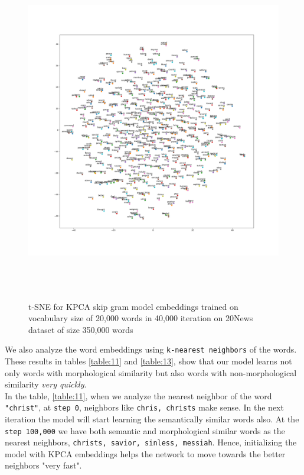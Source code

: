  \begin{figure}
  	\centering
  	\includegraphics[width=18cm,height=15cm,keepaspectratio]{files/M128smallnews/M128smallnews.png}
  	\caption{t-SNE for KPCA skip gram model embeddings trained on vocabulary size of 20,000 words in 40,000 iteration on 20News dataset of size 350,000 words }
  	\label{fig:t1sne}
  \end{figure}
We also analyze the word embeddings using \texttt{k-nearest neighbors} of the words. These results in tables \ref{table:11} and \ref{table:13}, show that our model learns not only words with morphological similarity but also words with non-morphological similarity \textit{very quickly}.\\
In the table, \ref{table:11}, when we analyze the nearest neighbor of the word \texttt{"christ"}, at \texttt{step 0}, neighbors like \texttt{chris, christs} make sense. In the next iteration the model will start learning the semantically similar words also. At the \texttt{step 100,000} we have both semantic and morphological similar words as the nearest neighbors, \texttt{christs, savior, sinless, messiah}. Hence, initializing the model with KPCA embeddings helps the network to move towards the better neighbors "very fast".\\
